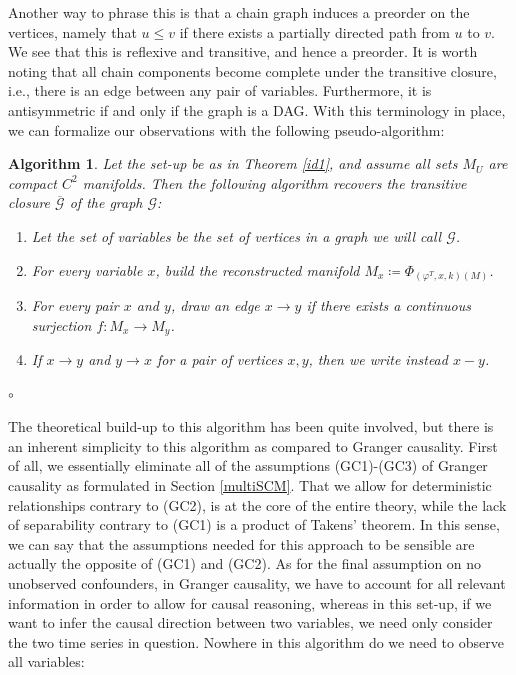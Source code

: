 \documentclass[11pt, a4paper]{memoir}
\theoremstyle{break}
\theoremstyle{break}
\newtheorem{inneralg}{Algorithm}
\newenvironment{alg}{\begin{inneralg}}{\ensuremath{\circ}\end{inneralg}}
\theoremstyle{nonumberplain}
\begin{document}
Another way to phrase this is that a chain graph induces a preorder on the vertices, namely that $u\leqslant v$ if there exists a partially directed path from $u$ to $v$. We see that this is reflexive and transitive, and hence a preorder. It is worth noting that all chain components become complete under the transitive closure, i.e., there is an edge between any pair of variables. Furthermore, it is antisymmetric if and only if the graph is a DAG. With this terminology in place, we can formalize our observations with the following pseudo-algorithm:
\begin{alg}
Let the set-up be as in Theorem \ref{id1}, and assume all sets $M_U$ are compact $C^2$ manifolds.  Then the following algorithm recovers the transitive closure $\overline{\mathcal{G}}$ of the graph $\mathcal{G}$:
\begin{enumerate}[label=\roman*.]
	\item Let the set of variables be the set of vertices in a graph we will call $\mathcal{G}$.
	\item For every variable $x$, build the reconstructed manifold $M_x\coloneqq \Phi	_{(\varphi^T,x,k)(M)}$.
	\item For every pair $x$ and $y$, draw an edge $x\to y$ if there exists a continuous surjection $f:M_x\to M_y$.
	\item If $x\to y$ and $y\to x$ for a pair of vertices $x,y$, then we write instead $x-y$.
\end{enumerate}
\end{alg}
The theoretical build-up to this algorithm has been quite involved, but there is an inherent simplicity to this algorithm as compared to Granger causality. First of all, we essentially eliminate all of the assumptions (GC1)-(GC3) of Granger causality as formulated in Section \ref{multiSCM}. That we allow for deterministic relationships contrary to (GC2), is at the core of the entire theory, while the lack of separability contrary to (GC1) is a product of Takens' theorem. In this sense, we can say that the assumptions needed for this approach to be sensible are actually the opposite of (GC1) and (GC2). As for the final assumption on no unobserved confounders, in Granger causality, we have to account for all relevant information in order to allow for causal reasoning, whereas in this set-up, if we want to infer the causal direction between two variables, we need only consider the two time series in question. Nowhere in this algorithm do we need to observe all variables:\\[5pt]
\end{document}
